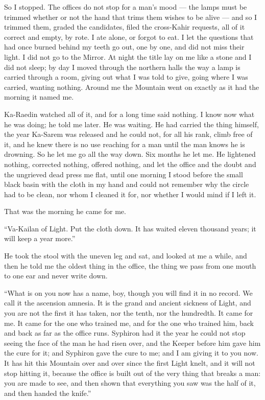 So I stopped. The offices do not stop for a man's mood --- the lamps must be trimmed whether or not the hand that trims them wishes to be alive --- and so I trimmed them, graded the candidates, filed the cross-Kahir requests, all of it correct and empty, by rote. I ate alone, or forgot to eat. I let the questions that had once burned behind my teeth go out, one by one, and did not miss their light. I did not go to the Mirror. At night the title lay on me like a stone and I did not sleep; by day I moved through the northern halls the way a lamp is carried through a room, giving out what I was told to give, going where I was carried, wanting nothing. Around me the Mountain went on exactly as it had the morning it named me.\par

Ka-Raedin watched all of it, and for a long time said nothing. I know now what he was doing; he told me later. He was waiting. He had carried the thing himself, the year Ka-Sarem was released and he could not, for all his rank, climb free of it, and he knew there is no use reaching for a man until the man knows he is drowning. So he let me go all the way down. Six months he let me. He lightened nothing, corrected nothing, offered nothing, and let the office and the doubt and the ungrieved dead press me flat, until one morning I stood before the small black basin with the cloth in my hand and could not remember why the circle had to be clean, nor whom I cleaned it for, nor whether I would mind if I left it.\par

That was the morning he came for me.\par

``Va-Kailan of Light. Put the cloth down. It has waited eleven thousand years; it will keep a year more.''\par

He took the stool with the uneven leg and sat, and looked at me a while, and then he told me the oldest thing in the office, the thing we pass from one mouth to one ear and never write down.\par

``What is on you now has a name, boy, though you will find it in no record. We call it the ascension amnesia. It is the grand and ancient sickness of Light, and you are not the first it has taken, nor the tenth, nor the hundredth. It came for me. It came for the one who trained me, and for the one who trained him, back and back as far as the office runs. Syphiron had it the year he could not stop seeing the face of the man he had risen over, and the Keeper before him gave him the cure for it; and Syphiron gave the cure to me; and I am giving it to you now. It has hit this Mountain over and over since the first Light knelt, and it will not stop hitting it, because the office is built out of the very thing that breaks a man: you are made to see, and then shown that everything you saw was the half of it, and then handed the knife.''\par

